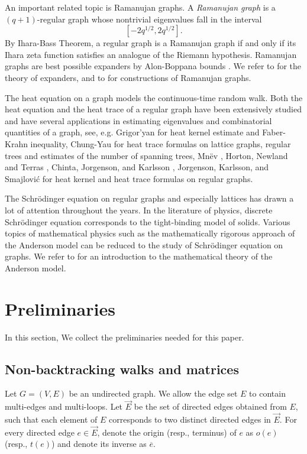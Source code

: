 \documentclass{article}
\begin{document}
An important related topic is Ramanujan graphs. A \emph{Ramanujan graph} is a $(q+1)$-regular graph whose nontrivial eigenvalues fall in the interval \[[-2q^{1/2},2q^{1/2}].\]   
By Ihara-Bass Theorem, a regular graph is a Ramanujan graph if and only if its Ihara zeta function satisfies an analogue of the Riemann hypothesis. Ramanujan graphs are best possible expanders by Alon-Boppana bounds \cite{Nilli91}. We refer to \cite{Mur03,HLW06} for the theory of expanders, and to \cite{LPS88,Mar88,Mor94,MMS13,MMS18} for constructions of Ramanujan graphs.

The heat equation on a graph models the continuous-time random walk.  Both the heat equation and the heat trace of a regular graph have been extensively studied and have several applications in estimating eigenvalues and combinatorial quantities of a graph, see, e.g. Grigor'yan \cite{Grigo09} for heat kernel estimate and Faber-Krahn inequality, Chung-Yau \cite{CY97, CY99} for heat trace formulas on lattice graphs, regular trees and estimates of the number of spanning trees, Mn\"ev \cite{Mnev07}, Horton, Newland and Terras \cite{HNT06}, Chinta, Jorgenson, and Karlsson \cite{CJK15}, Jorgenson, Karlsson, and Smajlovi{\'c} \cite{JKS24} for heat kernel and heat trace formulas on regular graphs. 

The Schr\"odinger equation on regular graphs and especially lattices has drawn a lot of attention throughout the years. In the literature of physics, discrete Schr\"odinger equation corresponds to the tight-binding model of solids. Various topics of mathematical physics such as the mathematically rigorous approach of the Anderson model can be reduced to the study of Schr\"odinger equation on graphs. We refer to \cite{stolz2011introduction} for an introduction to the mathematical theory of the Anderson model. 


\section{Preliminaries}

In this section, We collect the preliminaries needed for this paper. 

\subsection{Non-backtracking walks and matrices}\label{NBM}

Let $G=(V,E)$ be an undirected graph. We allow the edge set $E$ to contain multi-edges and multi-loops.  Let $\vec{E}$ be the set of directed edges obtained from $E$, such that each element of $E$ corresponds to two distinct directed edges in $\vec{E}$. For every directed edge $e \in \vec{E}$,  denote the origin (resp., terminus) of $e$ as $o(e)$ (resp., $t(e)$)  and denote its inverse as $\overline{e}$. 
\end{document}
